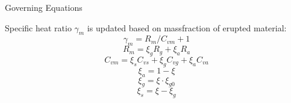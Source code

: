 \documentclass{beamer}
\begin{document}
\begin{frame}{Governing Equations}
\begin{minipage}{.46\textwidth}
Specific heat ratio $\gamma_m$ is updated based on massfraction of erupted material:
\begin{equation}
\gamma_m = R_m/C_{vm} + 1 \label{eq:gov-gm}
\end{equation}
\begin{equation}
R_m = \xi_g R_g + \xi_a R_a  \label{eq:gov-Rm}
\end{equation}
\begin{equation}
C_{vm} = \xi_s C_{vs} + \xi_g C_{vg} + \xi_a C_{va} \label{eq:gov-Cvm}
\end{equation}
\begin{equation}
\xi_a = 1 - \xi \label{eq:gov-na}
\end{equation}
\begin{equation}
\xi_g = \xi \cdot \xi_{g0} \label{eq:gov-ng}
\end{equation}
\begin{equation}
\xi_s = \xi - \xi_g \label{eq:gov-ns}
\end{equation}
\end{minipage}
%
\end{frame}
%
\end{document}
